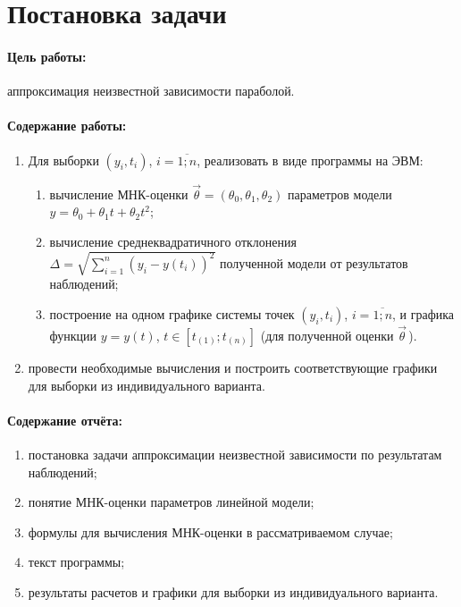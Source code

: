 
\section{Постановка задачи}

\paragraph{Цель работы:}аппроксимация неизвестной зависимости параболой.

\paragraph{Содержание работы:}
\begin{enumerate}
    \item Для выборки $(y_i, t_i)$, $i = \overline{1; n}$, реализовать в виде программы на ЭВМ:
    \begin{enumerate}
        \item вычисление МНК-оценки $\vec\theta = (\theta_0, \theta_1, \theta_2)$ параметров модели $y = \theta_0 + \theta_1 t + \theta_2 t^2$;
        \item вычисление среднеквадратичного отклонения $\Delta = \sqrt{\sum_{i=1}^{n}\left(y_i - y(t_i)\right)^2}$ полученной модели от результатов наблюдений;
        \item построение на одном графике системы точек $(y_i, t_i)$, $i = \overline{1; n}$, и графика функции $y = y(t)$, $t \in \left[t_{(1)}; t_{(n)}\right]$ (для полученной оценки $\vec\theta$\,).
    \end{enumerate}
    \item провести необходимые вычисления и построить соответствующие графики для выборки из индивидуального варианта.
\end{enumerate}

\paragraph{Содержание отчёта:}
\begin{enumerate}
    \item постановка задачи аппроксимации неизвестной зависимости по результатам наблюдений;
    \item понятие МНК-оценки параметров линейной модели;
    \item формулы для вычисления МНК-оценки в рассматриваемом случае;
    \item текст программы;
    \item результаты расчетов и графики для выборки из индивидуального варианта.
\end{enumerate}